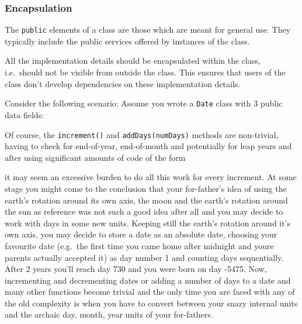 
\subsubsection{Encapsulation}

The \verb+public+ elements of a class are those which are meant for
general use. They typically include the public services offered by
instances of the class.

All the implementation details should be encapsulated within the class,
i.e.\ should not be visible from outside the class. This ensures that
users of the class don't develop dependencies on these implementation
details.

Consider the following scenario: Assume you wrote a \verb+Date+ class
with 3 public data fields:

Of course, the \verb+increment()+ and \verb+addDays(numDays)+ methods
are non-trivial, having to check for end-of-year, end-of-month and
potentially for leap years and after using significant amounts of code
of the form


\noindent
it may seem an excessive burden to do all this work for every increment.
At some stage you might come to the conclusion that your for-father's
idea of using the earth's rotation around its own axis, the moon and 
the earth's rotation around the sun as reference was not such a good idea
after all and you may decide to work with days in some new units. 
Keeping still the earth's rotation around it's own axis, you may decide
to store a date as an absolute date, choosing your favourite date (e.g.\
the first time you came home after midnight and youre parents actually
accepted it) as day number 1 and counting days sequentially. After 2 years
you'll reach day 730 and you were born on day -5475. Now, incrementing 
and decrementing dates or adding a number of days to a date and many other
functions become trivial and the only time you are faced with any of the 
old complexity is when you have to convert between your snazy internal
units and the archaic day, month, year units of your for-fathers. 

